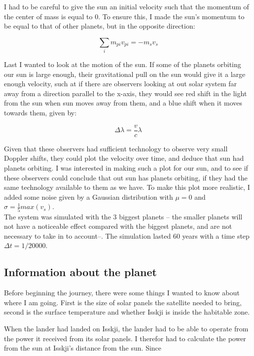 \documentclass[a4paper, 10pt]{article}
\begin{document}
I had to be careful to give the sun an initial velocity such that the momentum of the center of mass is equal to 0. To ensure this, I made the sun's momentum to be equal to that of other planets, but in the opposite direction:

\begin{equation}
\sum\limits_i m_{pi}v_{pi} = -m_sv_s
\end{equation}

Last I wanted to look at the motion of the sun. If some of the planets orbiting our sun is large enough, their gravitational pull on the sun would give it a large enough velocity, such at if there are observers looking at out solar system far away from a direction parallel to the x-axis, they would see red shift in the light from the sun when sun moves away from them, and a blue shift when it moves towards them, given by:

\begin{equation}
\Delta \lambda = \frac{v}{c}\lambda
\end{equation}

Given that these observers had sufficient technology to observe very small Doppler shifts, they could plot the velocity over time, and deduce that sun had planets orbiting. I was interested in making such a plot for our sun, and to see if these observers could conclude that out sun has planets orbiting, if they had the same technology available to them as we have. To make this plot more realistic, I added some noise given by a Gaussian distribution with $\mu = 0$ and $\sigma = \frac{1}{5} max(v_s)$.\\

The system was simulated with the 3 biggest planets -- the smaller planets will not have a noticeable effect compared with the biggest planets, and are not necessary to take in to account--. The simulation lasted 60 years with a time step $\Delta t = 1/20000$.

\subsection{Information about the planet}
Before beginning the journey, there were some things I wanted to know about where I am going. First is the size of solar panels the satellite needed to bring, second is the surface temperature and whether Isskji is inside the habitable zone.

When the lander had landed on Isskji, the lander had to be able to operate from the power it received from its solar panels. I therefor had to calculate the power from the sun at Isskji's distance from the sun. Since 
\end{document}
